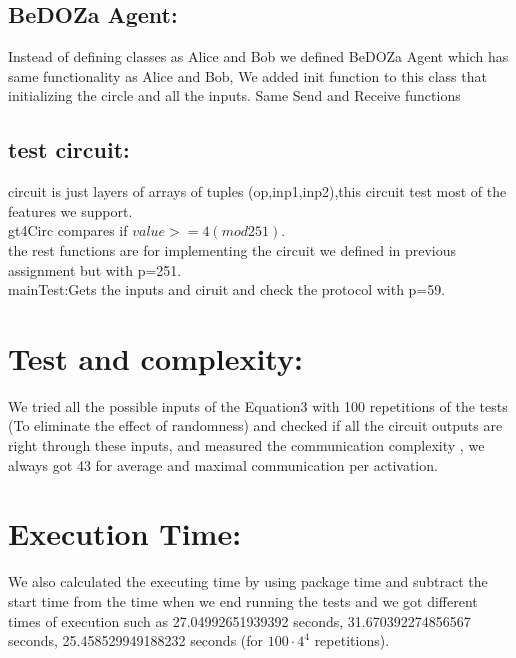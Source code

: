\documentclass{article}
\begin{document}
\subsection*{BeDOZa Agent:}
Instead of defining classes as Alice and Bob we defined BeDOZa Agent which has same functionality as Alice and Bob, We added init function to this class that initializing the circle and all the inputs.
Same Send and Receive functions 
\subsection*{test circuit:} circuit is just layers of arrays of tuples (op,inp1,inp2),this circuit test most of the features we support.
\\gt4Circ compares if $value >=4 (mod 251)$.
\\ the rest functions are for implementing the circuit we defined in previous assignment but with p=251.
\\{mainTest}:Gets the inputs and ciruit and check the protocol with p=59.
\section*{Test and complexity:}
We tried all the possible inputs of the Equation3 with 100 repetitions of the tests (To eliminate the effect of randomness) and checked if all the circuit outputs are right through these inputs, and measured the communication complexity , we always got 43 for average and maximal communication per activation.
\section*{Execution Time:}
We also calculated the executing time by using package time and subtract the start time from the time when we end running the tests and we got different times of execution such as 27.04992651939392 seconds, 31.670392274856567 seconds, 25.458529949188232 seconds (for $100 \cdot 4^4$ repetitions). 
\end{document}
